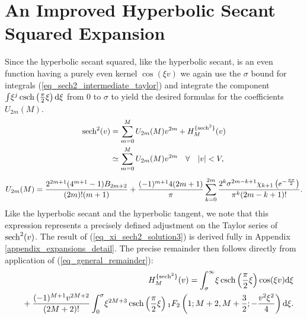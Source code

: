 \section{An Improved Hyperbolic Secant Squared Expansion}
Since the hyperbolic secant squared, like the hyperbolic secant, is an even
function having a purely even kernel $\cos(\xi v)$ we again use the $\sigma$
bound for integrals (\ref{eq_sech2_intermediate_taylor}) and integrate the
component
$
\int \!
\xi^j\operatorname{csch}\left(\frac{\pi}{2}\xi\right)
\mathrm{d}\xi
$
from $0$ to $\sigma$ to yield the desired formulas for the
coefficients $U_{2m}(M)$.
\begin{gather}
	\begin{split}
		\label{eq_sech2_expansion_full}
		\operatorname{sech}^2(v) &= \sum_{m=0}^{M} U_{2m}(M) v^{2m} + H_M^{\{\operatorname{sech}^2\}}(v) \\
		&\simeq \sum_{m=0}^{M} U_{2m}(M) v^{2m} \quad \forall \quad |v| < V,
	\end{split}
	\\[1ex]
	\begin{split}
		U_{2m}(M) = \frac{2^{2m+1}(4^{m+1} - 1)B_{2m+2}}
		                 {(2m)!(m+1)}
		+
		\frac{(-1)^{m+1}4(2m+1)}{\pi}
		\sum_{k=0}^{2m}
		\frac{2^k \sigma^{2m-k+1}
			 \chi_{k+1}\left(e^{-\frac{\pi \sigma}{2}}\right)}
		     {\pi^{k}(2m-k+1)!}.
		\label{eq_xi_sech2_solution3}
	\end{split}
\end{gather}
Like the hyperbolic secant and the hyperbolic tangent, we note that this
expression represents a precisely defined adjustment on
the Taylor series of $\operatorname{sech}^2(v)$.  The result of (\ref{eq_xi_sech2_solution3}) is
derived fully in Appendix \ref{appendix_expansions_detail}. The precise
remainder then follows directly from application of
(\ref{eq_general_remainder}):
\begin{align}
	\begin{split}
		&H_M^{\{\operatorname{sech}^2\}}(v) = \int_\sigma^{\infty} \!
		\xi \operatorname{csch}\left(\frac{\pi}{2}\xi\right)
		\cos(\xi v) \mathrm{d}\xi
		\label{eq_sech2_remainder2}
	\end{split}
	\\
	\begin{split}
		& \quad\quad + \frac{(-1)^{M+1}v^{2M+2}}{(2M+2)!} \int_0^{\sigma} \!
		\xi^{2M+3} \operatorname{csch}\left(\frac{\pi}{2}\xi\right)
		{}_{1}F_{2}\left(1; M+2, M+\frac{3}{2}; -\frac{v^2 \xi^2}{4}\right) \mathrm{d}\xi.
		\label{eq_sech2_remainder1}
	\end{split}
\end{align}

